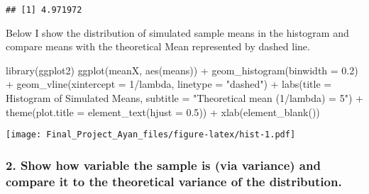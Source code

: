 \documentclass[
]{article}
\newenvironment{Shaded}{\begin{snugshade}}{\end{snugshade}}
\newcommand{\AttributeTok}[1]{\textcolor[rgb]{0.77,0.63,0.00}{#1}}
\newcommand{\DecValTok}[1]{\textcolor[rgb]{0.00,0.00,0.81}{#1}}
\newcommand{\FloatTok}[1]{\textcolor[rgb]{0.00,0.00,0.81}{#1}}
\newcommand{\FunctionTok}[1]{\textcolor[rgb]{0.00,0.00,0.00}{#1}}
\newcommand{\NormalTok}[1]{#1}
\newcommand{\OtherTok}[1]{\textcolor[rgb]{0.56,0.35,0.01}{#1}}
\newcommand{\SpecialCharTok}[1]{\textcolor[rgb]{0.00,0.00,0.00}{#1}}
\newcommand{\StringTok}[1]{\textcolor[rgb]{0.31,0.60,0.02}{#1}}
\begin{document}
\begin{Shaded}
\end{Shaded}

\begin{verbatim}
## [1] 4.971972
\end{verbatim}

Below I show the distribution of simulated sample means in the histogram
and compare means with the theoretical Mean represented by dashed line.

\begin{Shaded}
\begin{Highlighting}[]
\FunctionTok{library}\NormalTok{(ggplot2)}
\FunctionTok{ggplot}\NormalTok{(meanX, }\FunctionTok{aes}\NormalTok{(means)) }\SpecialCharTok{+} 
    \FunctionTok{geom\_histogram}\NormalTok{(}\AttributeTok{binwidth =} \FloatTok{0.2}\NormalTok{) }\SpecialCharTok{+} 
    \FunctionTok{geom\_vline}\NormalTok{(}\AttributeTok{xintercept =} \DecValTok{1}\SpecialCharTok{/}\NormalTok{lambda, }\AttributeTok{linetype =} \StringTok{"dashed"}\NormalTok{) }\SpecialCharTok{+}
    \FunctionTok{labs}\NormalTok{(}\AttributeTok{title =} \StringTok{\textquotesingle{}Histogram of Simulated Means\textquotesingle{}}\NormalTok{,}
         \AttributeTok{subtitle =} \StringTok{"Theoretical mean (1/lambda) = 5"}\NormalTok{) }\SpecialCharTok{+} 
    \FunctionTok{theme}\NormalTok{(}\AttributeTok{plot.title =} \FunctionTok{element\_text}\NormalTok{(}\AttributeTok{hjust =} \FloatTok{0.5}\NormalTok{)) }\SpecialCharTok{+}
    \FunctionTok{xlab}\NormalTok{(}\FunctionTok{element\_blank}\NormalTok{())}
\end{Highlighting}
\end{Shaded}

\texttt{[image: Final\_Project\_Ayan\_files/figure-latex/hist-1.pdf]}

\hypertarget{show-how-variable-the-sample-is-via-variance-and-compare-it-to-the-theoretical-variance-of-the-distribution.}{%
\subsubsection{2. Show how variable the sample is (via variance) and
compare it to the theoretical variance of the
distribution.}\label{show-how-variable-the-sample-is-via-variance-and-compare-it-to-the-theoretical-variance-of-the-distribution.}}
\end{document}
